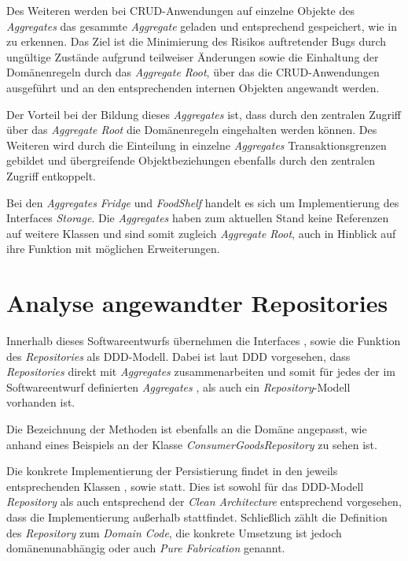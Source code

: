 Des Weiteren werden bei \ac{CRUD}-Anwendungen auf einzelne Objekte des \textit{Aggregates} das gesammte \textit{Aggregate} geladen und entsprechend gespeichert, wie in \href{}{} zu erkennen.
Das Ziel ist die Minimierung des Risikos auftretender Bugs durch ungültige Zustände aufgrund teilweiser Änderungen sowie die Einhaltung der Domänenregeln durch das \textit{Aggregate Root}, über das die \ac{CRUD}-Anwendungen ausgeführt und an den entsprechenden internen Objekten angewandt werden.

Der Vorteil bei der Bildung dieses \textit{Aggregates} ist, dass durch den zentralen Zugriff über das \textit{Aggregate Root} die Domänenregeln eingehalten werden können.
Des Weiteren wird durch die Einteilung in einzelne \textit{Aggregates} Transaktionsgrenzen gebildet und übergreifende Objektbeziehungen ebenfalls durch den zentralen Zugriff entkoppelt.

Bei den \textit{Aggregates} \href{}{\code{}}\textit{Fridge} und \href{}{\code{}}\textit{FoodShelf} handelt es sich um Implementierung des Interfaces \href{}{\code{}}\textit{Storage}.
Die \textit{Aggregates} haben zum aktuellen Stand keine Referenzen auf weitere Klassen und sind somit zugleich \textit{Aggregate Root}, auch in Hinblick auf ihre Funktion mit möglichen Erweiterungen.


\section{Analyse angewandter Repositories}
\label{domaindrivendesign>repositories}
Innerhalb dieses Softwareentwurfs übernehmen die Interfaces \href{}{}, \href{}{} sowie \href{}{} die Funktion des \textit{Repositories} als \ac{DDD}-Modell.
Dabei ist laut \ac{DDD} vorgesehen, dass \textit{Repositories} direkt mit \textit{Aggregates} zusammenarbeiten und somit für jedes der im Softwareentwurf definierten \textit{Aggregates} \href{}{}, \href{}{} als auch \href{}{} ein \textit{Repository}-Modell vorhanden ist.

Die Bezeichnung der Methoden ist ebenfalls an die Domäne angepasst, wie anhand eines Beispiels an der Klasse \href{}{\code{}}\textit{ConsumerGoodsRepository} zu sehen ist.

Die konkrete Implementierung der Persistierung findet in den jeweils entsprechenden Klassen \href{}{}, \href{}{} sowie \href{}{} statt.
Dies ist sowohl für das \ac{DDD}-Modell \textit{Repository} als auch entsprechend der \textit{Clean Architecture} entsprechend vorgesehen, dass die Implementierung außerhalb stattfindet. 
Schließlich zählt die Definition des \textit{Repository} zum \textit{Domain Code}, die konkrete Umsetzung ist jedoch domänenunabhängig oder auch \textit{Pure Fabrication} genannt.

